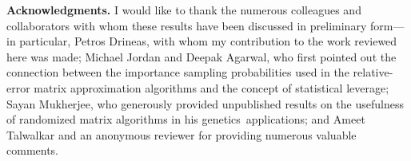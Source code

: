 \documentclass[twoside]{article}
\begin{document}
 

\vspace{0.25in}
\noindent
\textbf{Acknowledgments.}
I would like to thank the numerous colleagues and collaborators with whom 
these results have been discussed in preliminary form---in particular, Petros 
Drineas, with whom my contribution to the work reviewed here was made;
Michael Jordan and Deepak Agarwal, who first pointed out the connection 
between the importance sampling probabilities used in the relative-error 
matrix approximation algorithms and the concept of statistical leverage;
Sayan Mukherjee, who generously provided unpublished results on the 
usefulness of randomized matrix algorithms in his genetics~applications; 
and Ameet Talwalkar and an anonymous reviewer for providing numerous 
valuable comments.

\noindent
\end{document}
